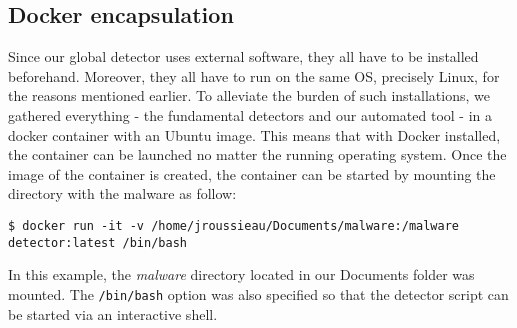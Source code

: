 \subsection{Docker encapsulation}

Since our global detector uses external software, they all have to be installed beforehand. Moreover, they all have to run on the same OS, precisely Linux, for the reasons mentioned earlier. To alleviate the burden of such installations, we gathered everything - the fundamental detectors and our automated tool - in a docker container with an Ubuntu image. This means that with Docker installed, the container can be launched no matter the running operating system. Once the image of the container is created, the container can be started by mounting the directory with the malware as follow:
\begin{lstlisting}
$ docker run -it -v /home/jroussieau/Documents/malware:/malware detector:latest /bin/bash
\end{lstlisting}
In this example, the \textit{malware} directory located in our Documents folder was mounted. The \texttt{/bin/bash} option was also specified so that the detector script can be started via an interactive shell.
